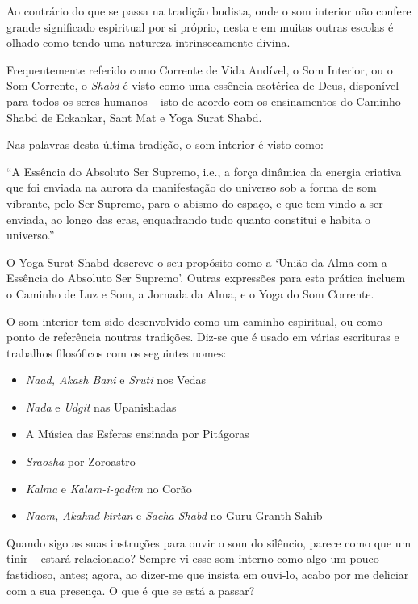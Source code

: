 Ao contrário do que se passa na tradição budista, onde o som interior
não confere grande significado espiritual por si próprio, nesta e em
muitas outras escolas é olhado como tendo uma natureza intrinsecamente
divina.

Frequentemente referido como Corrente de Vida Audível, o Som Interior,
ou o Som Corrente, o \emph{Shabd} é visto como uma essência esotérica de
Deus, disponível para todos os seres humanos -- isto de acordo com os
ensinamentos do Caminho Shabd de Eckankar, Sant Mat e Yoga Surat Shabd.

Nas palavras desta última tradição, o som interior é visto como:

``A Essência do Absoluto Ser Supremo, i.e., a força dinâmica da energia
criativa que foi enviada na aurora da manifestação do universo sob a
forma de som vibrante, pelo Ser Supremo, para o abismo do espaço, e que
tem vindo a ser enviada, ao longo das eras, enquadrando tudo quanto
constitui e habita o universo.''\cite{shabd}

O Yoga Surat Shabd descreve o seu propósito como a `União da Alma com a
Essência do Absoluto Ser Supremo'. Outras expressões para esta prática
incluem o Caminho de Luz e Som, a Jornada da Alma, e o Yoga do Som
Corrente.

O som interior tem sido desenvolvido como um caminho espiritual, ou como
ponto de referência noutras tradições. Diz-se que é usado em várias
escrituras e trabalhos filosóficos com os seguintes nomes:

\begin{itemize}
\item \emph{Naad, Akash Bani} e \emph{Sruti} nos Vedas
\item \emph{Nada} e \emph{Udgit} nas Upanishadas
\item A Música das Esferas ensinada por Pitágoras
\item \emph{Sraosha} por Zoroastro
\item \emph{Kalma} e \emph{Kalam-i-qadim} no Corão
\item \emph{Naam, Akahnd kirtan} e \emph{Sacha Shabd} no Guru Granth Sahib
\end{itemize}

\smallskip

 Quando sigo as suas instruções para ouvir o som do silêncio, parece
como que um tinir -- estará relacionado? Sempre vi esse som interno como
algo um pouco fastidioso, antes; agora, ao dizer-me que insista em
ouvi-lo, acabo por me deliciar com a sua presença. O que é que se está a
passar?

